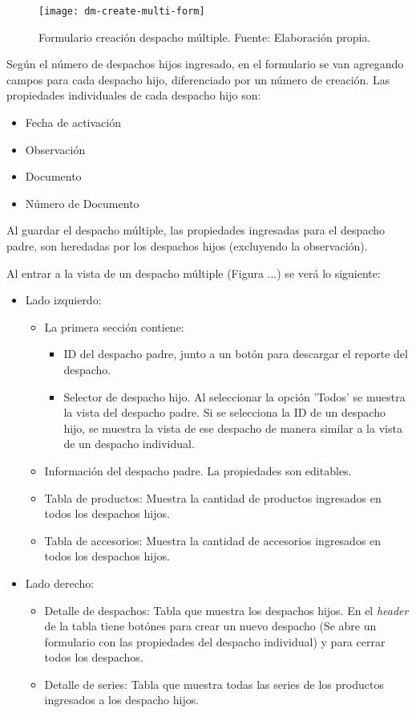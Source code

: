 \begin{figure}[H]
	\centering
	\texttt{[image: dm-create-multi-form]}
	\caption{\label{fig:dm-create-multi-form} Formulario creación despacho múltiple. Fuente: Elaboración propia.}
\end{figure}

Según el número de despachos hijos ingresado, en el formulario se van agregando campos para cada despacho hijo, diferenciado por un número de creación. Las propiedades individuales de cada despacho hijo son:
\begin{itemize}
    \item Fecha de activación
    \item Observación
    \item Documento
    \item Número de Documento
\end{itemize}

Al guardar el despacho múltiple, las propiedades ingresadas para el despacho padre, son heredadas por los despachos hijos (excluyendo la observación).

Al entrar a la vista de un despacho múltiple (Figura ...) se verá lo siguiente:

\begin{itemize}
    \item Lado izquierdo:
    \begin{itemize}
        \item La primera sección contiene:
        \begin{itemize}
            \item ID del despacho padre, junto a un botón para descargar el reporte del despacho.
            \item Selector de despacho hijo. Al seleccionar la opción 'Todos' se muestra la vista del despacho padre. Si se selecciona la ID de un despacho hijo, se muestra la vista de ese despacho de manera similar a la vista de un despacho individual.
        \end{itemize}
        \item Información del despacho padre. La propiedades son editables.
        \item Tabla de productos: Muestra la cantidad de productos ingresados en todos los despachos hijos.
        \item Tabla de accesorios: Muestra la cantidad de accesorios ingresados en todos los despachos hijos.
    \end{itemize}
    \item Lado derecho:
    \begin{itemize}
        \item Detalle de despachos: Tabla que muestra los despachos hijos. En el \textit{header} de la tabla tiene botónes para crear un nuevo despacho (Se abre un formulario con las propiedades del despacho individual) y para cerrar todos los despachos.
        \item Detalle de series: Tabla que muestra todas las series de los productos ingresados a los despacho hijos.
    \end{itemize}
\end{itemize}

